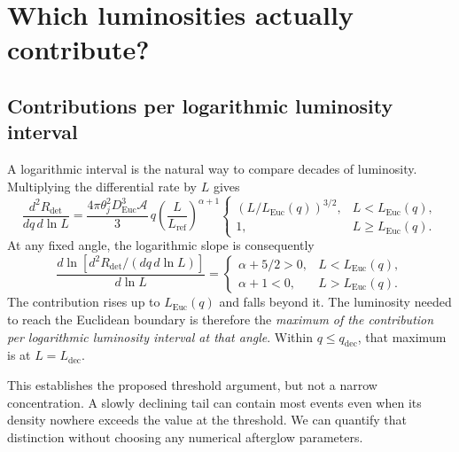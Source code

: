 \documentclass[11pt,a4paper]{article}
\newcommand{\Euc}{\mathrm{Euc}}
\newcommand{\dec}{\mathrm{dec}}
\newcommand{\Lref}{L_{\mathrm{ref}}}
\newcommand{\Ldec}{L_{\mathrm{dec}}}
\newcommand{\Rdet}{R_{\mathrm{det}}}
\begin{document}
\section{Which luminosities actually contribute?}
\label{sec:luminosities}
\subsection{Contributions per logarithmic luminosity interval}
A logarithmic interval is the natural way to compare decades of luminosity.
Multiplying the differential rate by $L$ gives
\begin{equation}
 \frac{d^2\Rdet}{dq\,d\ln L}
 =\frac{4\pi\theta_j^2D_\Euc^3\mathcal A}{3}\,q
 \left(\frac L{\Lref}\right)^{\alpha+1}
 \begin{cases}
 (L/L_\Euc(q))^{3/2},&L<L_\Euc(q),\\
 1,&L\ge L_\Euc(q).
 \end{cases}
 \label{eq:logL-rate}
\end{equation}
At any fixed angle, the logarithmic slope is consequently
\begin{equation}
 \frac{d\ln[d^2\Rdet/(dq\,d\ln L)]}{d\ln L}
 =\begin{cases}
 \alpha+5/2>0,&L<L_\Euc(q),\\
 \alpha+1<0,&L>L_\Euc(q).
 \end{cases}
 \label{eq:logL-slopes}
\end{equation}
The contribution rises up to $L_\Euc(q)$ and falls beyond it. The luminosity
needed to reach the Euclidean boundary is therefore the \emph{maximum of
the contribution per logarithmic luminosity interval at that angle}.
Within $q\le q_\dec$, that maximum is at $L=\Ldec$.

This establishes the proposed threshold argument, but not a narrow
concentration. A slowly declining tail can contain most events even when
its density nowhere exceeds the value at the threshold. We can quantify
that distinction without choosing any numerical afterglow parameters.
\end{document}
